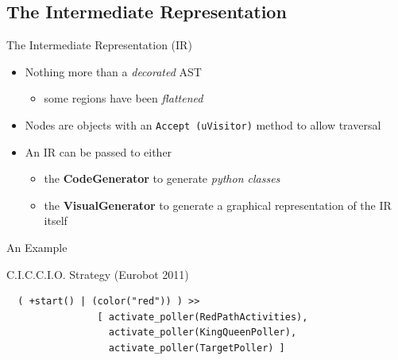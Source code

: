 \subsection{The Intermediate Representation}
\begin{frame}[fragile]{The Intermediate Representation (IR)}
  \begin{itemize}
  \item Nothing more than a \emph{decorated} AST
    \begin{itemize}
    \item some regions have been \emph{flattened}
    \end{itemize}
    \N
  \item Nodes are objects with an \texttt{Accept (uVisitor)} method to allow traversal
    \N
  \item An IR can be passed to either 
    \begin{itemize}
    \item the {\bf CodeGenerator} to generate \emph{python classes}
    \item the {\bf VisualGenerator} to generate a graphical representation of the IR
      itself
    \end{itemize}
  \end{itemize}
\end{frame}
\begin{frame}[fragile]{An Example}
  \begin{exampleblock}{C.I.C.C.I.O. Strategy (Eurobot 2011)}
\begin{verbatim}
  ( +start() | (color("red")) ) >> 
                [ activate_poller(RedPathActivities),
                  activate_poller(KingQueenPoller),
                  activate_poller(TargetPoller) ]
\end{verbatim}
  \end{exampleblock}
  \begin{figure}[!h]
    \begin{center}
    \end{center}
  \end{figure}
\end{frame}



